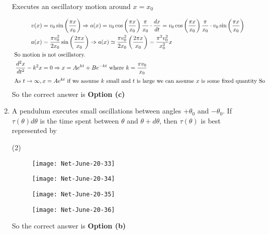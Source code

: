 \begin{enumerate}
\begin{tasks}
		\task[\textbf{d.}] Executes an oscillatory motion around $x=x_{0}$
	\end{tasks}
\begin{answer}
	\begin{align*}
	v(x)&=v_{0} \sin \left(\frac{\pi x}{x_{0}}\right) \Rightarrow a(x)=v_{0} \cos \left(\frac{\pi x}{x_{0}}\right) \frac{\pi}{x_{0}} \cdot \frac{d x}{d t}=v_{0} \cos \left(\frac{\pi x}{x_{0}}\right) \frac{\pi}{x_{0}} \cdot v_{0} \sin \left(\frac{\pi x}{x_{0}}\right)\\
	a(x)&=\frac{\pi v_{0}^{2}}{2 x_{0}} \sin \left(\frac{2 \pi x}{x_{0}}\right) \Rightarrow a(x) \simeq \frac{\pi v_{0}^{2}}{2 x_{0}}\left(\frac{2 \pi x}{x_{0}}\right)=\frac{\pi^{2} v_{0}^{2}}{x_{0}^{2}} x\\
\text{	So motion }&\text{is not oscillatory.}\\
	\frac{d^{2} x}{d t^{2}}-k^{2} x&=0 \Rightarrow x=A e^{k t}+B e^{-k t} \text { where } k=\frac{\pi v_{0}}{x_{0}}\\
\intertext{	As $t \rightarrow \infty, x=A e^{k t}$ if we assume $k$ small and $t$ is large we can assume $x$ is some fixed quantity So}
	\end{align*}
		So the correct answer is \textbf{Option (c)}
\end{answer}
\item  A pendulum executes small oscillations between angles $+\theta_{0}$ and $-\theta_{0}$. If $\tau(\theta) d \theta$ is the time spent between $\theta$ and $\theta+d \theta$, then $\tau(\theta)$ is best represented by
 \begin{tasks}(2)
	\task[\textbf{a.}]
	\begin{figure}[H]
		\centering
		\texttt{[image: Net-June-20-33]}
	\end{figure}
	\task[\textbf{b.}]
	\begin{figure}[H]
		\centering
		\texttt{[image: Net-June-20-34]}
	\end{figure}
	\task[\textbf{c.}]
	\begin{figure}[H]
		\centering
		\texttt{[image: Net-June-20-35]}
	\end{figure}
	\task[\textbf{d.}] 
	\begin{figure}[H]
		\centering
		\texttt{[image: Net-June-20-36]}
	\end{figure}
\end{tasks}
\begin{answer}
	So the correct answer is \textbf{Option (b)}

\end{answer}
\end{enumerate}
